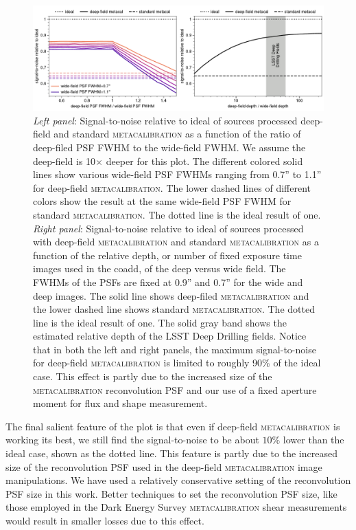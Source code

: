 \documentclass[twocolumn]{openjournal}
\makeatletter
\newcommand{\mcal}{\textsc{metacalibration}\@\xspace}
\makeatother
\begin{document}
\begin{figure}
    \centering
    \includegraphics[width=\textwidth]{s2n_ratio.pdf}
    \caption{
      \textit{Left panel}: Signal-to-noise relative to ideal of sources processed deep-field and standard \mcal
      as a function of the ratio of deep-filed PSF FWHM to the wide-field FWHM. We assume the deep-field is
      10$\times$ deeper for this plot. The different colored solid lines show various wide-field PSF FWHMs ranging from 0.7'' to
      1.1'' for deep-field \mcal. The lower dashed lines of different colors show the result at the same wide-field PSF FWHM for
      standard \mcal. The dotted line is the ideal result of one.
      \textit{Right panel}: Signal-to-noise relative to ideal of sources processed with deep-field \mcal and standard \mcal as a function of the relative depth, or number of fixed exposure time images
      used in the coadd,
      of the deep versus wide field. The FWHMs of the PSFs are fixed at 0.9''
      and 0.7'' for the wide and deep images. The solid line shows deep-filed \mcal and the lower dashed line shows standard \mcal.
      The dotted line is the ideal result of one.
      The solid gray band shows the estimated relative depth of the LSST Deep Drilling fields.
      Notice that in both the left and right panels, the maximum signal-to-noise for deep-field \mcal is limited to roughly 90\% of
      the ideal case. This effect is partly due to the increased size of the \mcal reconvolution PSF and our use of a fixed aperture moment
      for flux and shape measurement.}
    \label{fig:s2n}
\end{figure}


The final salient feature of the plot is that even if deep-field \mcal is working its
best, we still find the signal-to-noise to be about $10\%$ lower than the ideal case,
shown as the dotted line. This feature is partly due to the increased size of the reconvolution
PSF used in the deep-field \mcal image manipulations. We have used a relatively
conservative setting of the reconvolution PSF size in this work. Better techniques to
set the reconvolution PSF size, like those employed in the Dark Energy Survey \mcal
shear measurements \citep{desy3shear} would result in smaller losses due to this effect.
\end{document}
